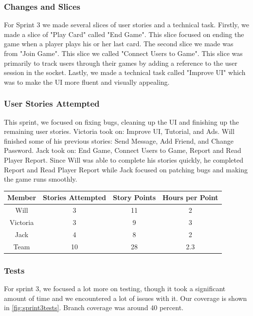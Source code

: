 \documentclass{article}
\begin{document}
\subsubsection{Changes and Slices}
For Sprint 3 we made several slices of user stories and a technical task. Firstly, we made a slice of "Play Card" called "End Game". This slice focused on ending the game when a player plays his or her last card. The second slice we made was from "Join Game". This slice we called "Connect Users to Game". This slice was primarily to track users through their games by adding a reference to the user session in the socket. Lastly, we made a technical task called "Improve UI" which was to make the UI more fluent and visually appealing.

\subsubsection{User Stories Attempted}
This sprint, we focused on fixing bugs, cleaning up the UI and finishing up the remaining user stories. Victoria took on: Improve UI, Tutorial, and Ads. Will finished some of his previous stories: Send Message, Add Friend, and Change Password. Jack took on: End Game, Connect Users to Game, Report and Read Player Report. Since Will was able to complete his stories quickly, he completed Report and Read Player Report while Jack focused on patching bugs and making the game runs smoothly.

\begin{table}[h]
\centering
\begin{tabular}{|c|c|c|c|}
\hline
\textbf{Member} & \textbf{Stories Attempted} & \textbf{Story Points} & \textbf{Hours per Point} \\ \hline
Will     & 3 & 11  & 2 \\ \hline
Victoria & 3 & 9 & 3 \\ \hline
Jack     & 4 & 8 & 2 \\ \hline
Team    & 10 & 28 & 2.3 \\ \hline
\end{tabular}
\end{table}

\subsubsection{Tests}

For sprint 3, we focused a lot more on testing, though it took a significant amount of time and we encountered a lot of issues with it. Our coverage is shown in \ref{fig:sprint3tests}. Branch coverage was around 40 percent.
\end{document}
